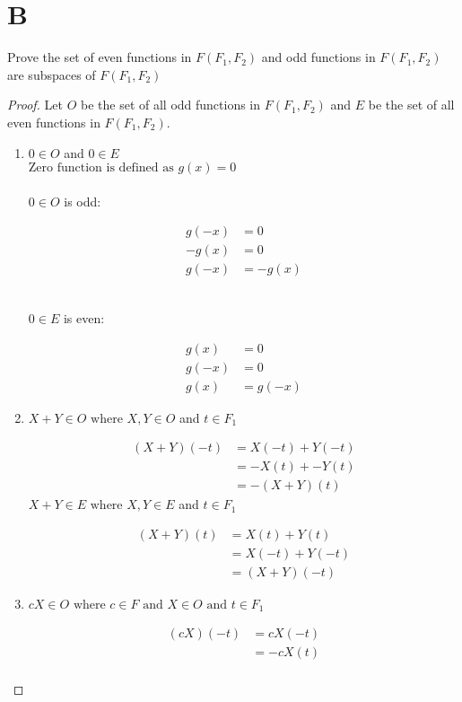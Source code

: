 \documentclass[11pt]{scrartcl}
\makeatletter
\newenvironment{Dequation}
  {%
  \def\tagform@##1{%
    \maketag@@@{\makebox[0pt][r]{(\ignorespaces##1\unskip\@@italiccorr)}}}%
  \ignorespaces
  }
  {%
  \def\tagform@##1{\maketag@@@{(\ignorespaces##1\unskip\@@italiccorr)}}%
  \ignorespacesafterend
  }
\makeatother
\begin{document}
\section{B}
Prove the set of even functions in $F(F_1, F_2)$ and odd functions in $F(F_1, F_2)$ are subspaces of $F(F_1, F_2)$ 
\begin{proof}
Let $O$ be the set of all odd functions in $F(F_1, F_2)$ and $E$ be the set of all even functions in $F(F_1, F_2)$.
\begin{enumerate}[label=\alph*.]
	\item{
			$0 \in O$ and $0 \in E$\\
			$\text{Zero function is defined as } g(x) = 0$\\
			\\$0\in O$ is odd: 
			\begin{Dequation}
			\begin{align*}
				g(-x) & = 0\\
				-g(x) & = 0\\
				g(-x) & = -g(x)
			\end{align*}
			\end{Dequation}

			\-\\$0\in E$ is even: 
			\begin{Dequation}
			\begin{align*}
				g(x) & = 0\\
				g(-x) & = 0\\
				g(x) & = g(-x)
			\end{align*}
			\end{Dequation}
		}
	
	\item{
		$X + Y \in O \text{ where } X,Y \in O$ and $t \in F_1$
		\begin{Dequation}
		\begin{align*}
			(X + Y)(-t) & = X(-t) + Y(-t) \\
						& = -X(t) + -Y(t)\tag{$X,Y \in O$}\\
			& = -(X + Y)(t)
		\end{align*}
		\end{Dequation}
		$X + Y \in E \text{ where } X,Y \in E$ and $t \in F_1$
		\begin{Dequation}
		\begin{align*}
			(X + Y)(t) & = X(t) + Y(t) \\
						& = X(-t) + Y(-t)\tag{$X,Y \in E$}\\
			& = (X + Y)(-t)
		\end{align*}
		\end{Dequation}
		}
	\item{
			$cX \in O \text{ where } c \in F \text{ and } X \in O \text{ and } t \in F_1$
			\begin{Dequation}
			\begin{align*}
				(cX)(-t) & = cX(-t) \\
						 & = -cX(t) \\
			\end{align*}
			\end{Dequation}
			
}
\end{enumerate}
\end{proof}
\end{document}
